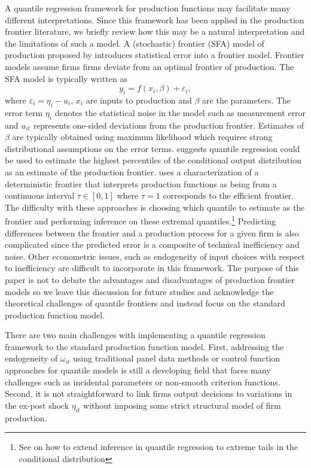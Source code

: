 \documentclass[11pt]{article}
\begin{document}
A quantile regression framework for production functions may facilitate many different interpretations. Since this framework has been applied in the production frontier literature, we briefly review how this may be a natural interpretation and the limitations of such a model. A (stochastic) frontier (SFA) model of production proposed by \cite{Aigner1977} introduces statistical error into a frontier model. Frontier models assume firms firms deviate from an optimal frontier of production. The SFA model is typically written as
\begin{equation}
y_{i}=f(x_{i}, \beta)+\varepsilon_{i},
\end{equation}
where $\varepsilon_{i}=\eta_{i}-u_{i}$, $x_{i}$ are inputs to production and $\beta$ are the parameters. The error term $\eta_{i}$ denotes the statistical noise in the model such as measurement error and $u_{it}$ represents one-sided deviations from the production frontier. Estimates of $\beta$ are typically obtained using maximum likelihood which requires strong distributional assumptions on the error terms. \cite{Bernini2004} suggests quantile regression could be used to estimate the highest percentiles of the conditional output distribution as an estimate of the production frontier. \cite{Aragon2005} uses a characterization of a deterministic frontier that interprets production functions as being from a continuous interval $\tau\in[0,1]$ where $\tau=1$ corresponds to the efficient frontier. The difficulty with these approaches is choosing which quantile to estimate as the frontier and performing inference on these extremal quantiles.\footnote{See \cite{Chernozhukov2005a} on how to extend inference in quantile regression to extreme tails in the conditional distribution} Predicting differences between the frontier and a production process for a given firm is also complicated since the predicted error is a composite of technical inefficiency and noise. Other econometric issues, such as endogeneity of input choices with respect to inefficiency are difficult to incorporate in this framework. The purpose of this paper is not to debate the advantages and disadvantages of production frontier models so we leave this discussion for future studies and acknowledge the theoretical challenges of quantile frontiers and instead focus on the standard production function model.

There are two main challenges with implementing a quantile regression framework to the standard production function model. First, addressing the endogeneity of $\omega_{it}$ using traditional panel data methods or control function approaches for quantile models is still a developing field that faces many challenges such as incidental parameters or non-smooth criterion functions. Second, it is not straightforward to link firms output decisions to variations in the ex-post shock $\eta_{it}$ without imposing some strict structural model of firm production.
\end{document}
